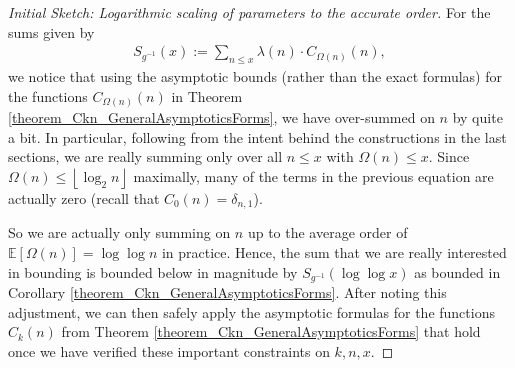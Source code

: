 \documentclass[11pt,reqno,a4letter]{article}
\numberwithin{figure}{section}
\numberwithin{table}{section}
\newcommand{\floor}[1]{\left\lfloor #1 \right\rfloor}
\theoremstyle{plain}
\numberwithin{theorem}{section}
\theoremstyle{definition}
\newcommand{\NBRef}[1]{}
\begin{document}
\begin{proof}[Initial Sketch: Logarithmic scaling of parameters to the accurate order] 
For the sums given by 
\begin{align*} 
S_{g^{-1}}(x) := \sum_{n \leq x} \lambda(n) \cdot C_{\Omega(n)}(n), 
\end{align*} 
we notice that using the asymptotic bounds (rather than the exact formulas) for the functions 
$C_{\Omega(n)}(n)$ in Theorem \ref{theorem_Ckn_GeneralAsymptoticsForms}, 
we have over-summed on $n$ by quite a bit. 
In particular, following from the intent behind the constructions in the last sections, 
we are really summing only over all $n \leq x$ with $\Omega(n) \leq x$. 
Since $\Omega(n) \leq \floor{\log_2 n}$ maximally, 
many of the terms in the previous equation are actually zero (recall that $C_0(n) = \delta_{n,1}$). 

So we are actually only summing on $n$ up to the average order of 
$\mathbb{E}[\Omega(n)] = \log\log n$ in practice. 
Hence, the sum that we are really interested in bounding is 
bounded below in magnitude by $S_{g^{-1}}(\log\log x)$ as bounded in 
Corollary \ref{theorem_Ckn_GeneralAsymptoticsForms}. After noting this adjustment, 
we can then safely apply the 
asymptotic formulas for the functions $C_k(n)$ from 
Theorem \ref{theorem_Ckn_GeneralAsymptoticsForms} 
that hold once we have verified these important constraints on $k,n,x$. 
\end{proof} 
\NBRef{A10-2020.04-26} 
\end{document}
